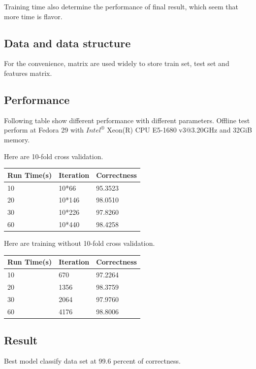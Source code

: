 \documentclass[conference,compsoc]{IEEEtran}
\begin{document}
Training time also determine the performance of final result, which seem
that more time is flavor. 


\subsection{Data and data structure}
For the convenience, matrix are used widely to store train set, test set and
features matrix.

\subsection{Performance}
Following table show different performance with different parameters. Offline
test perform at Fedora 29 with $Intel^{®}$ Xeon(R) CPU E5-1680 v3@3.20GHz and
32GiB memory.

Here are 10-fold cross validation.
\begin{center}
   \begin{tabular}{| l | l |l |}
   \hline
   Run Time(s)  &Iteration     &Correctness   \\ \hline
    10           &10*66        & 95.3523  \\
    20           &10*146       & 98.0510  \\
    30           &10*226       & 97.8260  \\
    60           &10*440       & 98.4258  \\
   \hline
   \end{tabular}
\end{center}

Here are training without 10-fold cross validation.
\begin{center}
   \begin{tabular}{| l | l |l |}
   \hline
   Run Time(s)  &Iteration     &Correctness   \\ \hline
    10           &670        & 97.2264  \\
    20           &1356       & 98.3759  \\
    30           &2064       & 97.9760  \\
    60           &4176       & 98.8006  \\
   \hline
   \end{tabular}
\end{center}



\subsection{Result}
Best model classify data set at 99.6 percent of correctness.
\end{document}
